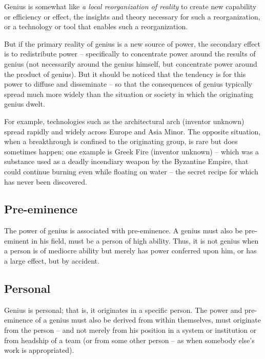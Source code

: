 \documentclass[
]{book}
\begin{document}
Genius is somewhat like \emph{a local reorganization of reality} to create new capability or efficiency or effect, the insights and theory necessary for such a reorganization, or a technology or tool that enables such a reorganization.

But if the primary reality of genius is a new source of power, the secondary effect is to redistribute power -- specifically to concentrate power around the results of genius (not necessarily around the genius himself, but concentrate power around the product of genius). But it should be noticed that the tendency is for this power to diffuse and disseminate -- so that the consequences of genius typically spread much more widely than the situation or society in which the originating genius dwelt.

For example, technologies such as the architectural arch (inventor unknown) spread rapidly and widely across Europe and Asia Minor. The opposite situation, when a breakthrough is confined to the originating group, is rare but does sometimes happen; one example is Greek Fire (inventor unknown) -- which was a substance used as a deadly incendiary weapon by the Byzantine Empire, that could continue burning even while floating on water -- the secret recipe for which has never been discovered.

\hypertarget{pre-eminence}{%
\subsection{Pre-eminence}\label{pre-eminence}}

The power of genius is associated with pre-eminence. A genius must also be pre-eminent in his field, must be a person of high ability. Thus, it is not genius when a person is of mediocre ability but merely has power conferred upon him, or has a large effect, but by accident.

\hypertarget{personal}{%
\subsection{Personal}\label{personal}}

Genius is personal; that is, it originates in a specific person. The power and pre-eminence of a genius must also be derived from within themselves, must originate from the person -- and not merely from his position in a system or institution or from headship of a team (or from some other person -- as when somebody else's work is appropriated).
\end{document}

